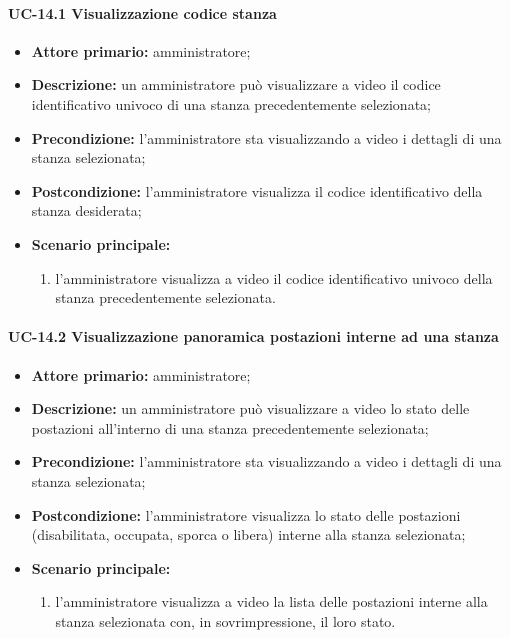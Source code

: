 \paragraph{UC-14.1 Visualizzazione codice stanza}
\begin{itemize}
    \item \textbf{Attore primario:} amministratore;
    \item \textbf{Descrizione:} un amministratore pu\`{o} visualizzare a video il codice identificativo univoco di una stanza precedentemente selezionata;
    \item \textbf{Precondizione:} l'amministratore sta visualizzando a video i dettagli di una stanza selezionata;
    \item \textbf{Postcondizione:} l'amministratore visualizza il codice identificativo della stanza desiderata;
    \item \textbf{Scenario principale:}
    \begin{enumerate}
        \item l'amministratore visualizza a video il codice identificativo univoco della stanza precedentemente selezionata.
    \end{enumerate}
\end{itemize}


\paragraph{UC-14.2 Visualizzazione panoramica postazioni interne ad una stanza}
\begin{itemize}
    \item \textbf{Attore primario:} amministratore;
    \item \textbf{Descrizione:} un amministratore pu\`{o} visualizzare a video lo stato delle postazioni all'interno di una stanza precedentemente selezionata;
    \item \textbf{Precondizione:} l'amministratore sta visualizzando a video i dettagli di una stanza selezionata;
    \item \textbf{Postcondizione:} l'amministratore visualizza lo stato delle postazioni (disabilitata, occupata, sporca o libera) interne alla stanza selezionata;
    \item \textbf{Scenario principale:}
    \begin{enumerate}
        \item l'amministratore visualizza a video la lista delle postazioni interne alla stanza selezionata con, in sovrimpressione, il loro stato.
    \end{enumerate}
\end{itemize}


